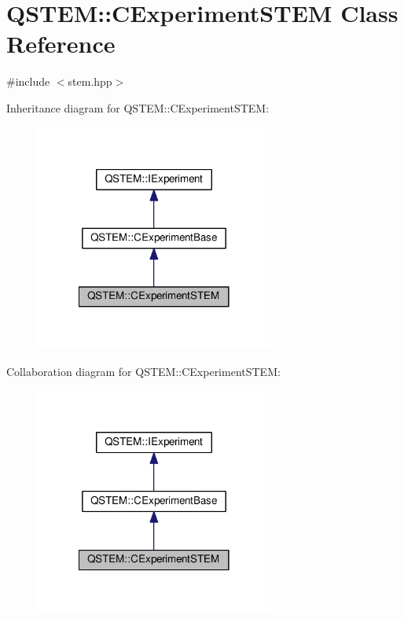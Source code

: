 \hypertarget{class_q_s_t_e_m_1_1_c_experiment_s_t_e_m}{\section{Q\-S\-T\-E\-M\-:\-:C\-Experiment\-S\-T\-E\-M Class Reference}
\label{class_q_s_t_e_m_1_1_c_experiment_s_t_e_m}
}


{\ttfamily \#include $<$stem.\-hpp$>$}



Inheritance diagram for Q\-S\-T\-E\-M\-:\-:C\-Experiment\-S\-T\-E\-M\-:
\nopagebreak
\begin{figure}[H]
\begin{center}
\leavevmode
\includegraphics[width=222pt]{class_q_s_t_e_m_1_1_c_experiment_s_t_e_m__inherit__graph}
\end{center}
\end{figure}


Collaboration diagram for Q\-S\-T\-E\-M\-:\-:C\-Experiment\-S\-T\-E\-M\-:
\nopagebreak
\begin{figure}[H]
\begin{center}
\leavevmode
\includegraphics[width=222pt]{class_q_s_t_e_m_1_1_c_experiment_s_t_e_m__coll__graph}
\end{center}
\end{figure}
